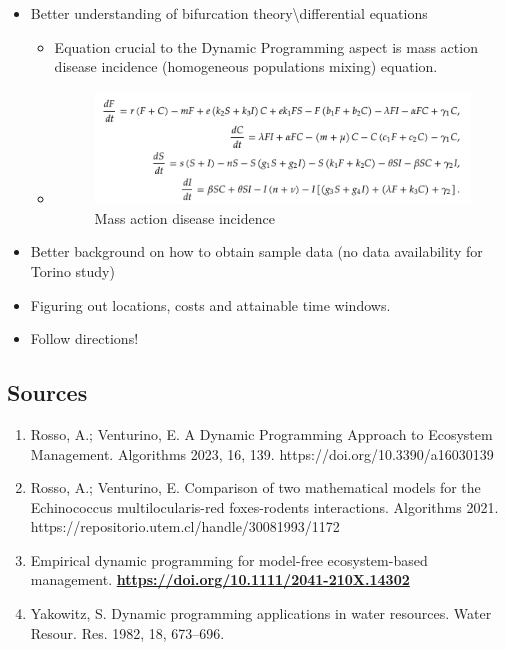 \documentclass[
  letterpaper,
  DIV=11,
  numbers=noendperiod]{scrartcl}
\providecommand{\tightlist}{%
  \setlength{\itemsep}{0pt}\setlength{\parskip}{0pt}}\usepackage{longtable,booktabs,array}
\begin{document}
\begin{itemize}
\item
  Better understanding of bifurcation theory\textbackslash differential
  equations

  \begin{itemize}
  \item
    Equation crucial to the Dynamic Programming aspect is mass action
    disease incidence (homogeneous populations mixing) equation.
  \item
    \begin{figure}[H]

    {\centering \includegraphics[width=4.65625in,height=\textheight]{images/equation.png}

    }

    \caption{Mass action disease incidence}

    \end{figure}%
  \end{itemize}
\item
  Better background on how to obtain sample data (no data availability
  for Torino study)
\item
  Figuring out locations, costs and attainable time windows.
\item
  Follow directions!
\end{itemize}

\subsection{Sources}\label{sources}

\begin{enumerate}
\def\labelenumi{\arabic{enumi}.}
\tightlist
\item
  Rosso, A.; Venturino, E. A Dynamic Programming Approach to Ecosystem
  Management. Algorithms 2023, 16, 139.
  https://doi.org/10.3390/a16030139
\item
  Rosso, A.; Venturino, E. Comparison of two mathematical models for the
  Echinococcus multilocularis-red foxes-rodents interactions. Algorithms
  2021. https://repositorio.utem.cl/handle/30081993/1172
\item
  Empirical dynamic programming for model-free ecosystem-based
  management.
  \href{https://doi.org/10.1111/2041-210X.14302}{\textbf{https://doi.org/10.1111/2041-210X.14302}}
\item
  Yakowitz, S. Dynamic programming applications in water resources.
  Water Resour. Res. 1982, 18, 673--696.
\end{enumerate}
\end{document}
